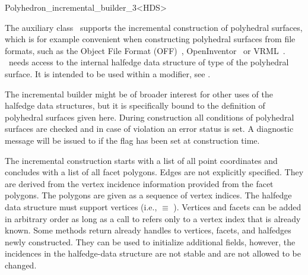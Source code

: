 
\ccRefPageBegin



\begin{ccRefClass}{Polyhedron_incremental_builder_3<HDS>}
\label{pagePolyIncrBuilder}

\ccDefinition
{}
  
The auxiliary class \ccClassTemplateName\ supports the incremental
construction of polyhedral surfaces, which is for example convenient
when constructing polyhedral surfaces from file formats, such as the
Object File Format (OFF)~\cite{cgal:p-gmgv16-96},
OpenInventor~\cite{cgal:w-impoo-94} or 
VRML~\cite{cgal:bpp-vrml-95,cgal:vrmls-97}.
\ccClassTemplateName\ needs access to the internal halfedge data
structure of type  of the polyhedral surface. It is intended
to be used within a modifier, see .

The incremental builder might be of broader interest for other uses of
the halfedge data structures, but it is specifically bound to the
definition of polyhedral surfaces given here. During construction all
conditions of polyhedral surfaces are checked and in case of violation
an error status is set. A diagnostic message will be issued to
 if the  flag has been set at construction
time.

The incremental construction starts with a list of all point
coordinates and concludes with a list of all facet polygons. Edges are
not explicitly specified. They are derived from the vertex incidence
information provided from the facet polygons. The polygons are given as a
sequence of vertex indices.  The halfedge data structure  must
support vertices (i.e.,  $\equiv$
). Vertices and facets can be added in arbitrary order
as long as a call to  refers only to a
vertex index that is already known. Some methods return already
handles to vertices, facets, and halfedges newly constructed. They can
be used to initialize additional fields, however, the incidences in
the halfedge-data structure are not stable and are not allowed to be
changed.


\end{ccRefClass}
